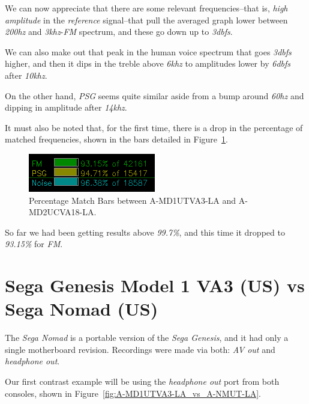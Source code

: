 \documentclass[10pt,a4paper]{report}
\newcommand{\hz}[1]{\textit{\mbox{#1\acrshort{hz}}}}
\newcommand{\khz}[1]{\textit{\mbox{#1\acrshort{khz}}}}
\newcommand{\db}[1]{\textit{\mbox{#1\acrshort{dbfs}}}}
\begin{document}
We can now appreciate that there are some relevant frequencies--that is, \textit{high amplitude} in the \textit{reference} signal--that pull the averaged graph lower between \hz{200} and \khz{3}-\textit{FM} spectrum, and these go down up to \db{3}.

We can also make out that peak in the human voice spectrum that goes \db{3} higher, and then it dips in the treble above \khz{6} to amplitudes lower by \db{6} after \khz{10}.

On the other hand, \textit{PSG} seems quite similar aside from a bump around \hz{60} and dipping in amplitude after \khz{14}.

It must also be noted that, for the first time, there is a drop in the percentage of matched frequencies, shown in the bars detailed in Figure~\ref{fig:A-MD1UTVA3-LA_vs_A-MD2UCVA18-LA_BARS}.

\begin{figure}[H]
	\centering
	\includegraphics[width=0.4\linewidth]{images/results/5-3-A-MD1UTVA3-LA_vs_A-MD2UCVA18-LA_bars.png}
	\caption[A-MD1UTVA3-LA vs A-MD2UCVA18-LA Bars]{Percentage Match Bars between A-MD1UTVA3-LA and A-MD2UCVA18-LA.}
	\label{fig:A-MD1UTVA3-LA_vs_A-MD2UCVA18-LA_BARS}
\end{figure}

So far we had been getting results above \textit{99.7\%}, and this time it dropped to \textit{93.15\%} for \textit{FM}.

\section{Sega Genesis Model 1 VA3 (US) vs\\ Sega Nomad (US)}

The \textit{Sega Nomad} is a portable version of the \textit{Sega Genesis}, and it had only a single motherboard revision. Recordings were made via both: \textit{AV out} and \textit{headphone out}. 

Our first contrast example will be using the \textit{headphone out} port from both consoles, shown in Figure~\ref{fig:A-MD1UTVA3-LA_vs_A-NMUT-LA}.
\end{document}
